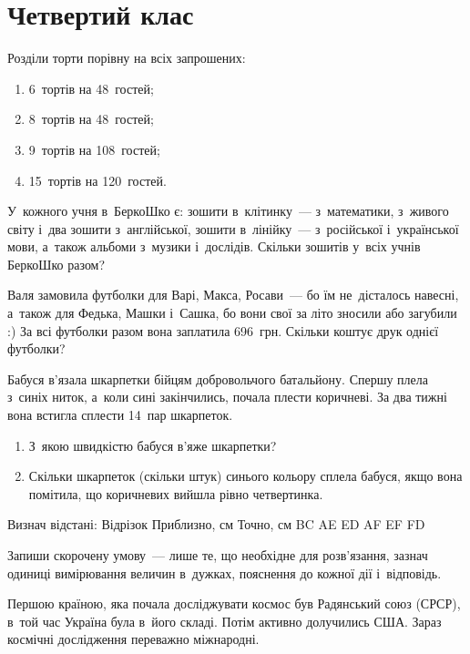 \chapter{Четвертий клас}

\problem
Розділи торти порівну на всіх запрошених:
\begin{enumerate}
    \item 6~тортів на 48~гостей;
    \item 8~тортів на 48~гостей;
    \item 9~тортів на 108~гостей;
    \item 15~тортів на 120~гостей.
\end{enumerate}


\problem
У~кожного учня в~БеркоШко є: зошити в~клітинку~--- з~математики,
з~живого світу і~два зошити з~англійської, зошити в~лінійку~--- 
з~російської і~української мови, а~також альбоми з~музики і~дослідів.
Скільки зошитів у~всіх учнів БеркоШко разом?


\problem
Валя замовила футболки для Варі, Макса, Росави~--- бо їм не~дісталось навесні,
а~також для Федька, Машки і~Сашка, бо вони свої за літо зносили або загубили :)
За всі футболки разом вона заплатила 696~грн.
Скільки коштує друк однієї футболки? 


\problem
Бабуся в’язала шкарпетки бійцям добровольчого батальйону.
Спершу плела з~синіх ниток, а~коли сині закінчились, почала плести коричневі.
За два тижні вона встигла сплести 14~пар шкарпеток.
\begin{enumerate}
    \item З~якою швидкістю бабуся в’яже шкарпетки? 
    \item Скільки шкарпеток (скільки штук) синього кольору сплела бабуся,
    якщо вона помітила, що коричневих вийшла рівно четвертинка.
\end{enumerate}


\problem
Визнач відстані:
Відрізок
Приблизно, см
Точно, см
BC
AE
ED
AF
EF
FD


\problem
Запиши скорочену умову~--- лише те, що необхідне для розв’язання,
зазнач одиниці вимірювання величин в~дужках, пояснення до кожної дії
і~відповідь.

Першою країною, яка почала досліджувати космос був Радянський союз (СРСР),
в~той час Україна була в~його складі. Потім активно долучились США.
Зараз космічні дослідження переважно міжнародні.

